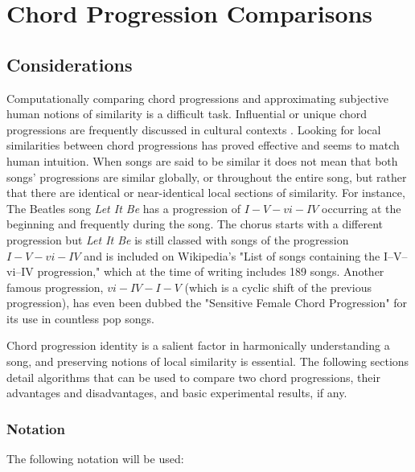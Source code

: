 \section{Chord Progression Comparisons}

\subsection{Considerations}

Computationally comparing chord progressions and approximating subjective human notions of similarity is a difficult task. Influential or unique chord progressions are frequently discussed in cultural contexts \cite{ogihara2008n}. Looking for local similarities between chord progressions has proved effective\cite{hanna2009alignment} and seems to match human intuition. When songs are said to be similar it does not mean that both songs' progressions are similar globally, or throughout the entire song, but rather that there are identical or near-identical local sections of similarity. For instance, The Beatles song \textit{Let It Be} has a progression of $I - V - vi - IV$ occurring at the beginning and frequently during the song. The chorus starts with a different progression but \textit{Let It Be} is still classed with songs of the progression $I - V - vi - IV$ and is included on Wikipedia's "List of songs containing the I–V–vi–IV progression," which at the time of writing includes 189 songs\cite{wikiprog1}. Another famous progression, $vi-IV-I-V$ (which is a cyclic shift of the previous progression), has even been dubbed the "Sensitive Female Chord Progression" for its use in countless pop songs\cite{hirsh2008}.

Chord progression identity is a salient factor in harmonically understanding a song, and preserving notions of local similarity is essential. The following sections detail algorithms that can be used to compare two chord progressions, their advantages and disadvantages, and basic experimental results, if any.

\subsubsection{Notation}

The following notation will be used:


